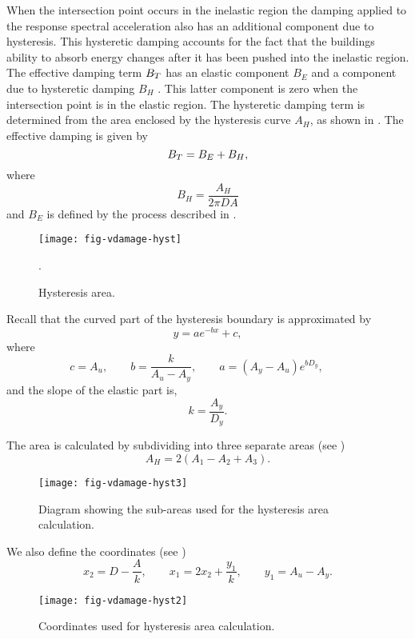 When the intersection point occurs in the inelastic region the
damping applied to the response spectral
acceleration also has an
additional component due to hysteresis. This hysteretic damping
accounts for the fact that the buildings ability to absorb energy
changes after it has been pushed into the inelastic region. The
effective damping term $\Beff$ has an
elastic component $B_E$ and a component due to hysteretic damping
$B_H$ . This latter component is zero when the intersection point
is in the elastic region. The hysteretic damping term is
determined from the area enclosed by the hysteresis curve $A_H$,
as shown in . The effective
damping is given by
\begin{equation}
\Beff = B_E + B_H,
\end{equation}
where
\begin{equation}
B_H = \frac{A_H}{2\pi DA}
\end{equation}
and $B_E$ is defined by the process described in
.
\begin{figure}
\centering
{}
\texttt{[image: fig-vdamage-hyst]}
\caption{Hysteresis area.}
\label{fig:vdamage-hystarea}.
\end{figure}

Recall that the curved part of the hysteresis boundary is
approximated by
$$
 y = ae^{-bx}+c,
$$
where
$$
 c = A_u, \qquad
 b = \frac{k}{A_u-A_y}, \qquad
 a = (A_y-A_u)e^{b D_y}, \qquad
$$
and the slope of the elastic part is,
$$
 k = \frac{A_y}{D_y}.
$$

The area is calculated by subdividing into three separate areas
(see )
$$
 A_H = 2(A_1-A_2+A_3).
$$

\begin{figure}[htp]
\centering
{}
\texttt{[image: fig-vdamage-hyst3]}
\caption{Diagram showing the sub-areas used for the hysteresis
area calculation.}
\label{fig:vdamage-hyst3}
\end{figure}


We also define the coordinates (see )
$$
x_2 = D-\frac{A}{k}, \qquad x_1 = 2x_2+\frac{y_1}{k}, \qquad y_1 =
A_u-A_y.
$$

\begin{figure}[htp]
\centering {}  
  
\texttt{[image: fig-vdamage-hyst2]}
\caption{Coordinates used for hysteresis area calculation.}
\label{fig:vdamage-hyst2}
\end{figure}

